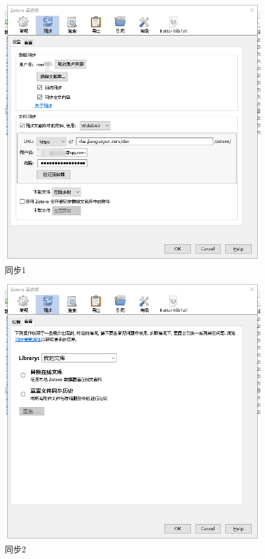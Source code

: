\begin{figure}
	\centering
	\includegraphics[scale=0.8]{Fig/zotero2.png}
	\caption{\label{op2}同步1}
\end{figure}
\begin{figure}
	\centering
	\includegraphics[scale=0.8]{Fig/zotero3.png}
	\caption{\label{op3}同步2}
\end{figure}

